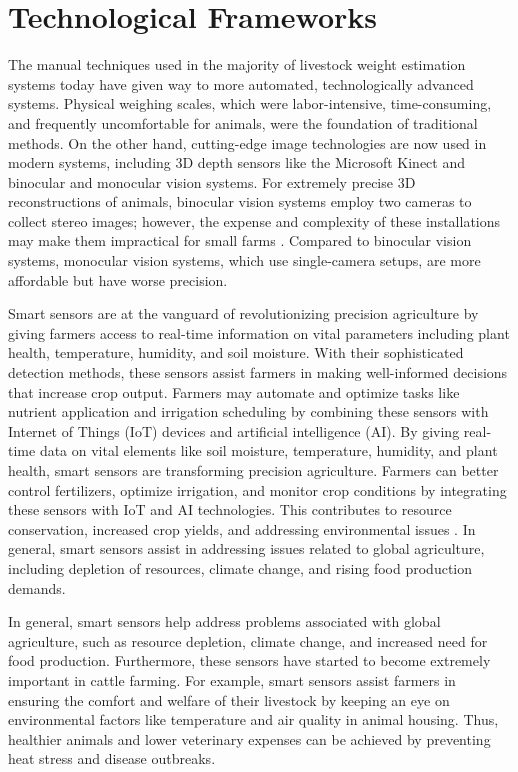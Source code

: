 {\section{Technological Frameworks}

The manual techniques used in the majority of livestock weight estimation systems today have given way to more automated, technologically advanced systems. Physical weighing scales, which were labor-intensive, time-consuming, and frequently uncomfortable for animals, were the foundation of traditional methods. On the other hand, cutting-edge image technologies are now used in modern systems, including 3D depth sensors like the Microsoft Kinect and binocular and monocular vision systems. For extremely precise 3D reconstructions of animals, binocular vision systems employ two cameras to collect stereo images; however, the expense and complexity of these installations may make them impractical for small farms \citep{rousing2004stepping}. Compared to binocular vision systems, monocular vision systems, which use single-camera setups, are more affordable but have worse precision.

Smart sensors are at the vanguard of revolutionizing precision agriculture by giving farmers access to real-time information on vital parameters including plant health, temperature, humidity, and soil moisture. With their sophisticated detection methods, these sensors assist farmers in making well-informed decisions that increase crop output. Farmers may automate and optimize tasks like nutrient application and irrigation scheduling by combining these sensors with Internet of Things (IoT) devices and artificial intelligence (AI). By giving real-time data on vital elements like soil moisture, temperature, humidity, and plant health, smart sensors are transforming precision agriculture. Farmers can better control fertilizers, optimize irrigation, and monitor crop conditions by integrating these sensors with IoT and AI technologies. This contributes to resource conservation, increased crop yields, and addressing environmental issues \citep{soussi2024smart}. In general, smart sensors assist in addressing issues related to global agriculture, including depletion of resources, climate change, and rising food production demands.

In general, smart sensors help address problems associated with global agriculture, such as resource depletion, climate change, and increased need for food production. Furthermore, these sensors have started to become extremely important in cattle farming. For example, smart sensors assist farmers in ensuring the comfort and welfare of their livestock by keeping an eye on environmental factors like temperature and air quality in animal housing. Thus, healthier animals and lower veterinary expenses can be achieved by preventing heat stress and disease outbreaks\citep{terence2024systematic}.

}
